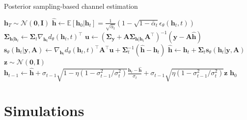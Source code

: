 \documentclass[lettersize,journal]{IEEEtran}
\begin{document}
\begin{algorithm}[!t]
\caption{Posterior sampling-based channel estimation}
\label{alg:algorithm1}
\begin{algorithmic}[1]
\STATE $\mathbf{h}_T \sim \mathcal{N}(\mathbf{0}, \mathbf{I})$
	\STATE $\hat{\mathbf{h}} \gets \mathbb{E}[\mathbf{h}_{0}|\mathbf{h}_{t}] = \frac{1}{\sqrt{ \bar{\alpha}_{t} }}(1-\sqrt{ 1-\bar{\alpha}_{t} }\epsilon_{\theta}(\mathbf{h}_{t},t))$
	\STATE $\boldsymbol{\Sigma}_{\mathbf{h}|\mathbf{h}_{t}} \gets \boldsymbol{\Sigma}_{t} \nabla_{\mathbf{h}_{t}}d_{\theta}(\mathbf{h}_{t},t)^{\top}$
	\STATE $\mathbf{u} \gets (\boldsymbol{\Sigma}_{\mathbf{y}}+\mathbf{A}\boldsymbol{\Sigma}_{\mathbf{h}|\mathbf{h}_{t}}\mathbf{A}^{\top})^{-1}(\mathbf{y}-\mathbf{A}\hat{\mathbf{h}})$
	\STATE $\mathbf{s}_{\theta}(\mathbf{h}_{t}|\mathbf{y},\mathbf{A}) \gets \nabla_{\mathbf{h}_{t}}d_{\theta}(\mathbf{h}_{t},t)^{\top}\mathbf{A}^{\top}\mathbf{u} + \boldsymbol{\Sigma}_{t}^{-1}(\hat{\mathbf{h}}-\mathbf{h}_{t})$
	\STATE $\hat{\mathbf{h}} \gets \mathbf{h}_{t} + \boldsymbol{\Sigma}_{t}\mathbf{s}_{\theta}(\mathbf{h}_{t}|\mathbf{y},\mathbf{A})$
	\STATE $\mathbf{z}\sim\mathcal{N}(\mathbf{0},\mathbf{I})$
	\STATE $\mathbf{h}_{t-1} \gets \hat{\mathbf{h}} + \sigma_{t-1}\sqrt{ 1-\eta( 1- \sigma_{t-1}^{2} /\sigma_{t}^{2} ) }\frac{\mathbf{h}_{t}-\hat{\mathbf{h}}}{\sigma_{t}} + \sigma_{t-1}\sqrt{ \eta( 1- \sigma_{t-1}^{2} / \sigma_{t}^{2}) }\mathbf{z}$
\ENDFOR
\RETURN $\mathbf{h}_{0}$
\end{algorithmic}
\end{algorithm}

\section{Simulations}
\end{document}
